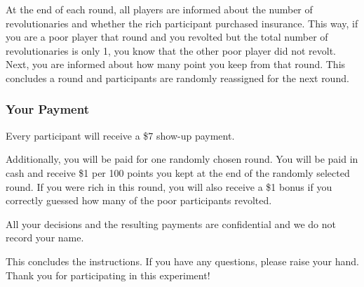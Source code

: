 \documentclass[12pt]{article}
\begin{document}
	At the end of each round, all players are informed about the number of 
	revolutionaries and whether the rich participant purchased insurance. This 
	way, if you are a poor player that round and you revolted but the total 
	number of revolutionaries is only 1, you know that the other poor player 
	did not revolt. Next, you are informed about how many point you keep from 
	that round. This concludes a round and participants are randomly reassigned 
	for the next round.
	
	\subsubsection*{Your Payment}
	Every participant will receive a \$7 show-up payment.
	
	Additionally, you will be paid for one randomly chosen round. You will be 
	paid in cash and receive \$1 per 100 points you kept at the end of the 
	randomly selected round. If you were rich in this round, you will also 
	receive a \$1 bonus if you correctly guessed how many of the poor 
	participants revolted.
	
	All your decisions and the resulting payments are confidential and we do 
	not record your name.
	
	\bigskip
	This concludes the instructions. If you have any questions, please raise 
	your hand. Thank you for participating in this experiment!
	
\end{document}
